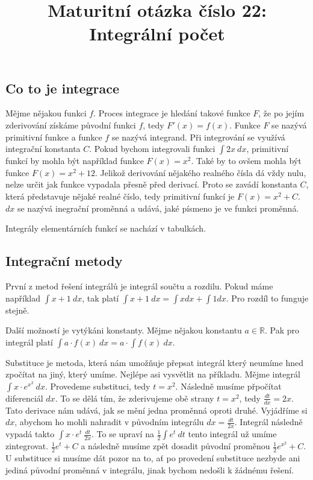 \documentclass[12pt]{article}
\title{Maturitní otázka číslo 22: Integrální počet}
\author{}
\date{}
\begin{document}
\maketitle
\subsection*{Co to je integrace}
Mějme nějakou funkci $f$. Proces integrace je hledání takové funkce $F$, že po jejím zderivování
získáme původní funkci $f$, tedy $F'(x) = f(x)$. Funkce $F$ se nazývá primitivní funkce a funkce
$f$ se nazývá integrand. Při
integrování se využívá integrační konstanta $C$. Pokud bychom integrovali funkci $\int 2x \ dx$,
primitivní funkcí by mohla být například funkce $F(x) = x^2$. Také by to ovšem mohla být funkce $F(x)
= x^2 + 12$. Jelikož derivování nějakého realného čísla dá vždy nulu, nelze určit jak funkce vypadala
přesně před derivací. Proto se zavádí konstanta $C$, která představuje nějaké realné číslo, tedy
primitivní funkcí je $F(x) = x^2 + C$. $dx$ se nazývá inegrační proměnná a udává, jaké písmeno je
ve funkci proměnná.

Integrály elementárních funkcí se nachází v tabulkách.
\subsection*{Integrační metody}
První z metod řešení integrálů je integrál součtu a rozdilu. Pokud máme například $\int x + 1 \ dx$,
tak platí $\int x + 1 \ dx =  \int x dx + \int 1 dx$. Pro rozdíl to funguje stejně.

Další možností je vytýkáni konstanty. Mějme nějakou konstantu $a \in \mathbb{R}$. Pak pro integrál
platí $\int a \cdot f(x) \ dx = a \cdot \int f(x) \ dx$.

Substituce je metoda, která nám umožňuje přepsat integrál který neumíme hned zpočítat na jiný, který
umíme. Nejlépe asi vysvětlit na příkladu. Mějme integrál $\int x \cdot e^{x^2} \ dx$. Provedeme
substituci, tedy $t = x^2$. Následně musíme přpočítat diferenciál $dx$. To se dělá tím, že
zderivujeme obě strany $t = x^2$, tedy $\frac{dt}{dx} = 2x$. Tato derivace nám udává, jak se mění
jedna proměnná oproti druhé. Vyjádříme si $dx$, abychom ho mohli nahradit v původním integrálu
$dx = \frac{dt}{2x}$. Integrál následně vypadá takto $\int x \cdot e^t \ \frac{dt}{2x}$. To se upraví
na $\frac{1}{2} \int e^t \ dt$ tento integrál už umíme zintegrovat. $\frac{1}{2} e^t + C$ a následně
musíme zpět dosadit původní proměnou $\frac{1}{2} e^{x^2} + C$. U substituce si musíme dát pozor
na to, ať po provedení substituce nezbyde ani jediná původní proměnná v integrálu, jinak bychom
nedošli k žádnému řešení.
\end{document}
